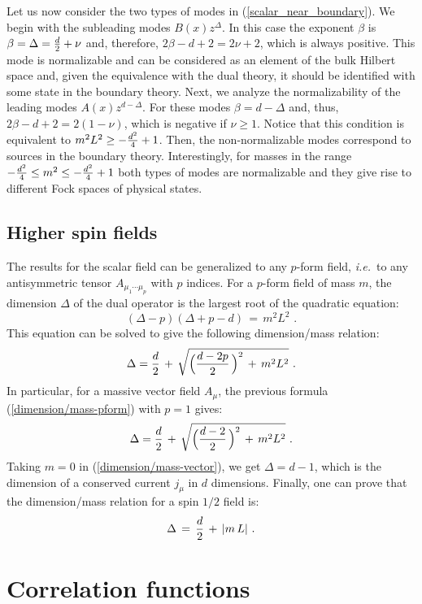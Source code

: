 \documentclass[12pt,notitlepage,a4paper]{article}
\newcommand{\beq}{\begin{equation}}
\newcommand{\eeq}{\end{equation}}
\def\ie{{\emph{i.e.}}}
\begin{document}
Let us now consider the two types of modes in (\ref{scalar_near_boundary}). We begin with the subleading modes $B(x)z^{\Delta}$.  In this case  the exponent  $\beta$ is $\beta= \Delta={d\over 2}+\nu$ and, therefore,  $2\beta-d+2=2\nu+2$, which is always positive. This mode is normalizable and can be considered as an element of the bulk Hilbert space and, given the equivalence with the dual theory, it should be identified with some state in the boundary theory. Next, we analyze the normalizability of the leading modes $A(x)z^{d-\Delta}$. 
For these modes $\beta=d-\Delta$ and, thus,   $2\beta-d+2=2(1-\nu)$, which is negative if $\nu\ge 1$. Notice that this condition is equivalent to $m^2 L^2\ge -{d^2\over 4}+1$. Then, the non-normalizable modes correspond to sources in the boundary theory. 
Interestingly,  for masses in the range $-{d^2\over 4}\le m^2\le  -{d^2\over 4}+1$ both types of modes are normalizable and they give rise to different Fock spaces of physical states. 

\subsection{Higher spin fields}

The results for the scalar field can be generalized to any $p$-form field, \ie\ to any antisymmetric tensor $A_{\mu_1\cdots \mu_p}$ with $p$ indices. For a $p$-form field of mass $m$, the dimension $\Delta$ of the dual operator is the largest root of the quadratic equation:
\beq
(\Delta-p)(\Delta+p-d)\,=\,m^2L^2\,\,.
\eeq
This equation can be solved to give the following dimension/mass relation:
\beq
\Delta={d\over 2}\,+\,\sqrt{
\Big({d-2p\over 2}\,\Big)^2\,+\,m^2 L^2}\,\,.
\label{dimension/mass-pform}
\eeq
In particular, for a massive vector field $A_{\mu}$, the previous formula (\ref{dimension/mass-pform}) with $p=1$ gives:
\beq
\Delta={d\over 2}\,+\,\sqrt{
\Big({d-2\over 2}\,\Big)^2\,+\,m^2 L^2}\,\,.
\label{dimension/mass-vector}
\eeq
Taking $m=0$ in (\ref{dimension/mass-vector}), we get $\Delta=d-1$, which is  the dimension of a conserved current $j_{\mu}$ in $d$ dimensions. Finally, one can prove that the dimension/mass relation for  a spin $1/2$ field is:
\beq
\Delta\,=\,{d\over 2}\,+\,|m\,L|\,\,.
\eeq


\section{Correlation functions}
\end{document}
